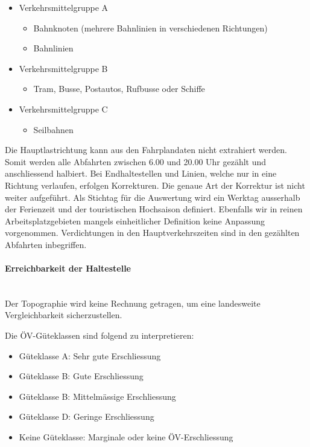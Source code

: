 \begin{itemize}[noitemsep]
    \item Verkehrsmittelgruppe A
    \begin{itemize}
        \item Bahnknoten (mehrere Bahnlinien in verschiedenen Richtungen)
        \item Bahnlinien
    \end{itemize}
    \item Verkehrsmittelgruppe B
    \begin{itemize}
        \item Tram, Busse, Postautos, Rufbusse oder Schiffe
    \end{itemize}
    \item Verkehrsmittelgruppe C
    \begin{itemize}
        \item Seilbahnen
    \end{itemize}
\end{itemize}

Die Hauptlastrichtung kann aus den Fahrplandaten nicht extrahiert werden.
Somit werden alle Abfahrten zwischen 6.00 und 20.00 Uhr gezählt und anschliessend halbiert. Bei Endhaltestellen und Linien, welche nur in eine Richtung verlaufen, erfolgen Korrekturen.
Die genaue Art der Korrektur ist nicht weiter aufgeführt.
Als Stichtag für die Auswertung wird ein Werktag ausserhalb der Ferienzeit und der touristischen Hochsaison definiert.
Ebenfalls wir in reinen Arbeitsplatzgebieten mangels einheitlicher Definition keine Anpassung vorgenommen.
Verdichtungen in den Hauptverkehrszeiten sind in den gezählten Abfahrten inbegriffen.

\paragraph{Erreichbarkeit der Haltestelle}~\\
\label{Berechnungsmethodik ARE:Erreichbarkeit der Haltestelle}
Der Topographie wird keine Rechnung getragen, um eine landesweite Vergleichbarkeit sicherzustellen.

Die \gls{ÖV-Güteklassen} sind folgend zu interpretieren:

\begin{itemize}[noitemsep]
    \item Güteklasse A: Sehr gute Erschliessung
    \item Güteklasse B: Gute Erschliessung
    \item Güteklasse B: Mittelmässige Erschliessung
    \item Güteklasse D: Geringe Erschliessung
    \item Keine Güteklasse: Marginale oder keine \acs{ÖV}-Erschliessung
\end{itemize}

